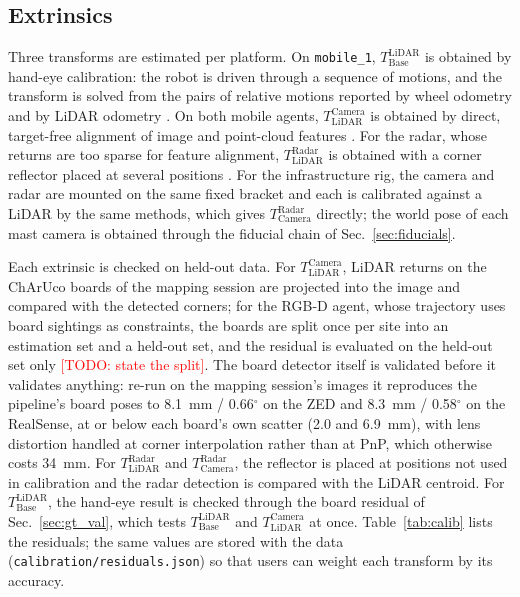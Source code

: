 \documentclass[journal]{IEEEtran}
\newcommand{\todo}[1]{\textcolor{red}{[TODO: #1]}}
\newcommand{\Ttransform}[2]{\ensuremath{T_{\mathrm{#1}}^{\mathrm{#2}}}}
\begin{document}
\subsection{Extrinsics}
\label{sec:spatial}
Three transforms are estimated per platform. On \texttt{mobile\_1},
\Ttransform{Base}{LiDAR} is obtained by hand-eye calibration: the
robot is driven through a sequence of motions, and the transform is
solved from the pairs of relative motions reported by wheel odometry
and by LiDAR odometry \cite{furrer2018handeye}. On both mobile agents,
\Ttransform{LiDAR}{Camera} is obtained by direct, target-free alignment
of image and point-cloud features \cite{koide2023lidarcam}. For the
radar, whose returns are too sparse for feature alignment,
\Ttransform{LiDAR}{Radar} is obtained with a corner reflector placed at
several positions \cite{domhof2019calib}. For the infrastructure rig,
the camera and radar are mounted on the same fixed bracket and each is
calibrated against a LiDAR by the same methods, which gives
\Ttransform{Camera}{Radar} directly; the world pose of each mast camera
is obtained through the fiducial chain of Sec.~\ref{sec:fiducials}.

Each extrinsic is checked on held-out data. For
\Ttransform{LiDAR}{Camera}, LiDAR returns on the ChArUco boards of the
mapping session are projected into the image and compared with the
detected corners; for the RGB-D agent, whose trajectory uses board
sightings as constraints, the boards are split once per site into an
estimation set and a held-out set, and the residual is evaluated on
the held-out set only \todo{state the split}. The board detector
itself is validated before it validates anything: re-run on the
mapping session's images it reproduces the pipeline's board poses to
\SI{8.1}{\milli\metre} / 0.66$^\circ$ on the ZED and
\SI{8.3}{\milli\metre} / 0.58$^\circ$ on the RealSense, at or below
each board's own scatter (\SI{2.0}{} and \SI{6.9}{\milli\metre}),
with lens distortion handled at corner interpolation rather than at
PnP, which otherwise costs \SI{34}{\milli\metre}. For
\Ttransform{LiDAR}{Radar} and \Ttransform{Camera}{Radar}, the reflector
is placed at positions not used in calibration and the radar detection
is compared with the LiDAR centroid. For \Ttransform{Base}{LiDAR}, the
hand-eye result is checked through the board residual of
Sec.~\ref{sec:gt_val}, which tests \Ttransform{Base}{LiDAR} and
\Ttransform{LiDAR}{Camera} at once. Table~\ref{tab:calib} lists the
residuals; the same values are stored with the data
(\texttt{calibration/residuals.json}) so that users can weight each
transform by its accuracy.
\end{document}
